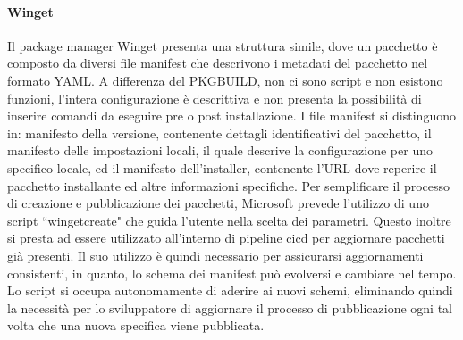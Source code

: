 \paragraph{Winget}\label{chap:winget} Il package manager Winget presenta una struttura simile, dove un pacchetto è composto da diversi file manifest che descrivono i metadati del pacchetto nel formato YAML. A differenza del PKGBUILD, non ci sono script e non esistono funzioni, l'intera configurazione è descrittiva e non presenta la possibilità di inserire comandi da eseguire pre o post installazione. I file manifest si distinguono in: manifesto della versione, contenente dettagli identificativi del pacchetto, il manifesto delle impostazioni locali, il quale descrive la configurazione per uno specifico locale, ed il manifesto dell'installer, contenente l'URL dove reperire il pacchetto installante ed altre informazioni specifiche. Per semplificare il processo di creazione e pubblicazione dei pacchetti, Microsoft prevede l'utilizzo di uno script ``wingetcreate" che guida l'utente nella scelta dei parametri. Questo inoltre si presta ad essere utilizzato all'interno di pipeline \ac{cicd} per aggiornare pacchetti già presenti. Il suo utilizzo è quindi necessario per assicurarsi aggiornamenti consistenti, in quanto, lo schema dei manifest può evolversi e cambiare nel tempo. Lo script si occupa autonomamente di aderire ai nuovi schemi, eliminando quindi la necessità per lo sviluppatore di aggiornare il processo di pubblicazione ogni tal volta che una nuova specifica viene pubblicata.

